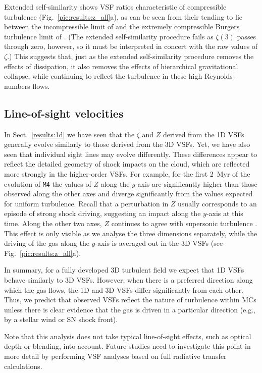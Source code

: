 Extended self-similarity shows VSF ratios characteristic of compressible turbulence (Fig.~\ref{pic:results:z_all}a), as can be seen from their tending to lie between the incompressible limit of \citet{She1994} and the extremely compressible Burgers turbulence limit of \citet{Boldyrev2002}.
(The extended self-similarity procedure fails as $\zeta(3)$ passes through zero, however, so it must be interpreted in concert with the raw values of $\zeta$.)
This suggests that, just as the extended self-similarity procedure removes the effects of dissipation, it also removes the effects of hierarchical gravitational collapse, while continuing to reflect the turbulence in these high Reynolds-numbers flows.


\subsection{Line-of-sight velocities}\label{discussion:1d}

In Sect.~\ref{results:1d} we have seen that the $\zeta$ and $Z$ derived from the 1D VSFs generally evolve similarly to those derived from the 3D VSFs.
Yet, we have also seen that individual sight lines may evolve differently.
These differences appear to reflect the detailed geometry of shock impacts on the cloud, which are reflected more strongly in the higher-order VSFs.
For example, for the first 2~Myr of the evolution of \texttt{M4} the values of $Z$ along the $y$-axis are significantly higher than those observed along the other axes and diverge significantly from the values expected for uniform turbulence.
Recall that a perturbation in $Z$ usually corresponds to an episode of strong shock driving, suggesting an impact along the $y$-axis at this time. 
Along the other two axes, $Z$ continues to agree with supersonic turbulence \citep{Boldyrev2002}.
This effect is only visible as we analyse the three dimensions separately, while the driving of the gas along the $y$-axis is averaged out in the 3D VSFs (see Fig.~\ref{pic:results:z_all}a).

In summary, for a fully developed 3D turbulent field we expect that 1D VSFs behave similarly to 3D VSFs.
However, when there is a preferred direction along which the gas flows, the 1D and 3D VSFs differ significantly from each other. 
Thus, we predict that observed VSFs reflect the nature of turbulence within MCs unless there is clear evidence that the gas is driven in a particular direction (e.g., by a stellar wind or SN shock front).

Note that this analysis does not take typical line-of-sight effects, such as optical depth or blending, into account. 
Future studies need to investigate this point in more detail by performing VSF analyses based on full radiative transfer calculations.



